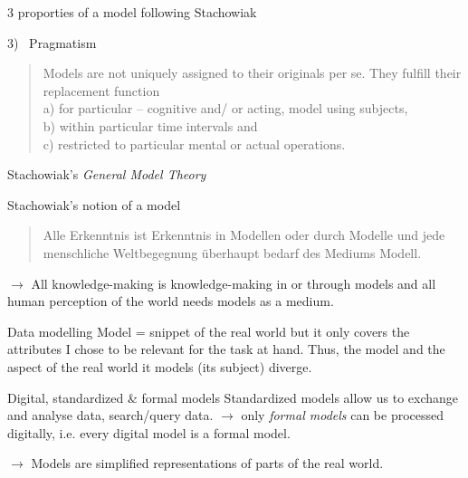 \begin{frame}[allowframebreaks]{3 proporties of a model following Stachowiak}
\begin{alertblock}{3)~ Pragmatism}
\begin{quote}
    \alert{ Models are not uniquely assigned to their originals per se. They fulfill their replacement function \\
    a) for particular – cognitive and/ or acting, model using subjects, \\
    b) within particular time intervals and \\
    c) restricted to particular mental or actual operations.}
\end{quote}
\end{alertblock}

\end{frame}

\begin{frame}{Stachowiak's \emph{General Model Theory}}

\begin{block}{Stachowiak's notion of a model}
\begin{quote}
    Alle Erkenntnis ist Erkenntnis in Modellen oder durch Modelle und jede menschliche Weltbegegnung überhaupt bedarf des Mediums Modell.
\end{quote}
\alert{$\to$ All knowledge-making is knowledge-making in or through models and all human perception of the world needs models as a medium. }
\end{block}

\begin{block}{Data modelling}\small
Model = snippet of the real world but it only covers the attributes I chose to be relevant for the task at hand. 
Thus, the model and the aspect of the real world it models (its subject) diverge. 
\end{block}

\begin{block}{Digital, standardized \& formal models}\small 
Standardized models allow us to exchange and analyse data, search/query data. 
 $\to$ only \emph{formal models} can be processed digitally, i.e. every digital model is a formal model.
\end{block}

\alert{$\to$ Models are simplified representations of parts of the real world.}

\end{frame}

